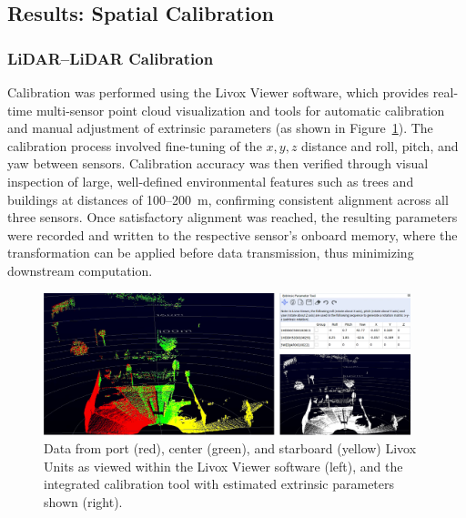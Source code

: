 \documentclass{erauthesis}
\begin{document}
\subsection{Results: Spatial Calibration}
\label{sec:spatial_calib_results}
\subsubsection{LiDAR–LiDAR Calibration} \label{results_lidarLidar_calib}


Calibration was performed using the Livox Viewer software, which provides real-time multi-sensor point cloud visualization and tools for automatic calibration and manual adjustment of extrinsic parameters (as shown in Figure~\ref{fig:LidarLidar_calib}). 
The calibration process involved fine-tuning of the $x, y, z$ distance and roll, pitch, and yaw between sensors.
Calibration accuracy was then verified through visual inspection of large, well-defined environmental features such as trees and buildings at distances of 100–200~m, confirming consistent alignment across all three sensors.
Once satisfactory alignment was reached, the resulting parameters were recorded and written to the respective sensor’s onboard memory, where the transformation can be applied before data transmission, thus minimizing downstream computation. 

\begin{figure}[ht]
\centering
        \includegraphics[width=0.95\textwidth]{Images/livox_viewer.png} 
\caption{Data from port (red), center (green), and starboard (yellow) Livox Units as viewed within the Livox Viewer software (left), and the integrated calibration tool with estimated extrinsic parameters shown (right). }
\label{fig:LidarLidar_calib}
\end{figure}
\end{document}
